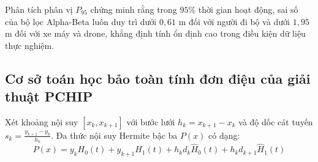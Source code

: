 \begin{table}[H]
\centering
\caption{Phân vị sai số định vị thực nghiệm trên các kịch bản dữ liệu thực tế ($n=10$)}
\label{tab:real-data-percentiles}
\end{table}

Phân tích phân vị $P_{95}$ chứng minh rằng trong $95\%$ thời gian hoạt động, sai số của bộ lọc Alpha-Beta luôn duy trì dưới $0{,}61$ m đối với người đi bộ và dưới $1{,}95$ m đối với xe máy và drone, khẳng định tính ổn định cao trong điều kiện dữ liệu thực nghiệm.

\subsection{Cơ sở toán học bảo toàn tính đơn điệu của giải thuật PCHIP}

\hspace{0.5cm} Xét khoảng nội suy $[x_k, x_{k+1}]$ với bước lưới $h_k = x_{k+1} - x_k$ và độ dốc cát tuyến $s_k = \frac{y_{k+1} - y_k}{h_k}$. Đa thức nội suy Hermite bậc ba $P(x)$ có dạng:
\begin{equation}
P(x) = y_k H_0(t) + y_{k+1} H_1(t) + h_k d_k \hat{H}_0(t) + h_k d_{k+1} \hat{H}_1(t)
\label{eq:hermite-polynomial-basis}
\end{equation}

